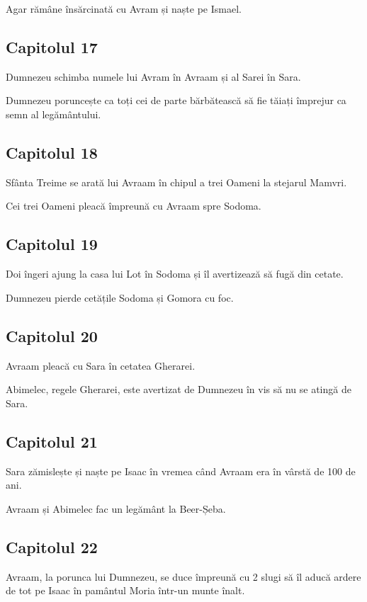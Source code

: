 \documentclass[12pt,a4paper]{article}
\begin{document}
Agar rămâne însărcinată cu Avram și naște pe Ismael.

\subsection{Capitolul 17}

Dumnezeu schimba numele lui Avram în Avraam și al Sarei în Sara.

Dumnezeu poruncește ca toți cei de parte bărbătească să fie
tăiați împrejur ca semn al legământului.

\subsection{Capitolul 18}

Sfânta Treime se arată lui Avraam în chipul a trei Oameni la stejarul Mamvri.

Cei trei Oameni pleacă împreună cu Avraam spre Sodoma.

\subsection{Capitolul 19}

Doi îngeri ajung la casa lui Lot în Sodoma și îl avertizează să fugă din cetate.

Dumnezeu pierde cetățile Sodoma și Gomora cu foc.

\subsection{Capitolul 20}

Avraam pleacă cu Sara în cetatea Gherarei.

Abimelec, regele Gherarei, este avertizat de Dumnezeu în vis să nu se atingă de Sara.

\subsection{Capitolul 21}

Sara zămislește și naște pe Isaac în vremea când Avraam era în vârstă de 100 de ani.

Avraam și Abimelec fac un legământ la Beer-Șeba.


\subsection{Capitolul 22}

Avraam, la porunca lui Dumnezeu, se duce împreună cu 2 slugi să îl aducă
ardere de tot pe Isaac în pamântul Moria într-un munte înalt.
\end{document}

